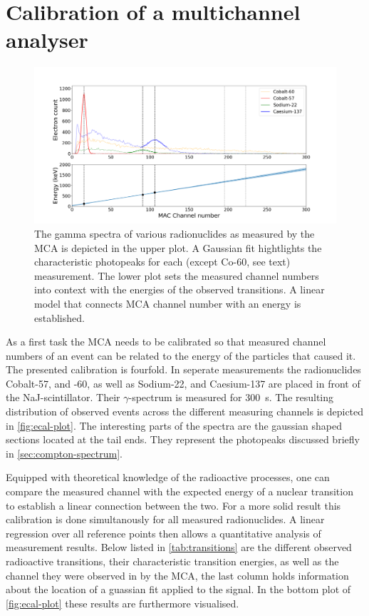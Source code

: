 
\section{Calibration of a multichannel analyser}
\label{sec:ecal}

\begin{figure}
	\includegraphics[width=1.0\textwidth]{./fig/ecal-plot.png}
	\caption{The gamma spectra of various radionuclides as measured by the MCA
	is depicted in the upper plot. A Gaussian fit hightlights the characteristic
	photopeaks for each (except Co-60, see text) measurement. The lower plot
	sets the measured channel numbers into context with the energies of the
	observed transitions. A linear model that connects MCA channel number with an
	energy is established.}\label{fig:ecal-plot}
\end{figure}

As a first task the MCA needs to be calibrated so that measured channel numbers of an
event can be related to the energy of the particles that caused it. The presented
calibration is fourfold. In seperate measurements the radionuclides Cobalt-57, and
-60, as well as Sodium-22, and Caesium-137 are placed in front of the
NaJ-scintillator. Their $\gamma$-spectrum is measured for \SI{300}{\second}. The
resulting distribution of observed events across the different measuring channels is
depicted in \autoref{fig:ecal-plot}. The interesting parts of the spectra are the
gaussian shaped sections located at the tail ends. They represent the photopeaks
discussed briefly in \autoref{sec:compton-spectrum}.

Equipped with theoretical knowledge of the radioactive processes, one can compare the
measured channel with the expected energy of a nuclear transition to establish a
linear connection between the two. For a more solid result this calibration is done
simultanously for all measured radionuclides. A linear regression over all reference
points then allows a quantitative analysis of measurement results. Below listed in
\autoref{tab:transitions} are the different observed radioactive transitions, their
characteristic transition energies, as well as the channel they were observed in by
the MCA, the last column holds information about the location of a guassian fit
applied to the signal. In the bottom plot of \autoref{fig:ecal-plot} these results
are furthermore visualised.

